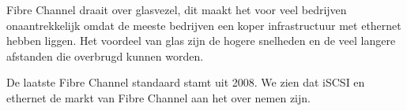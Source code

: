 Fibre Channel draait over glasvezel, dit maakt het voor veel bedrijven onaantrekkelijk omdat de meeste bedrijven een koper infrastructuur met ethernet hebben liggen. Het voordeel van glas zijn de hogere snelheden en de veel langere afstanden die overbrugd kunnen worden.

De laatste Fibre Channel standaard stamt uit 2008. We zien dat iSCSI en ethernet de markt van Fibre Channel aan het over nemen zijn.
